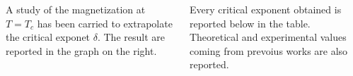 \documentclass{beamer}
\begin{document}
\begin{frame}

\begin{columns}


A study of the magnetization at $T=T_c$ has been carried to extrapolate the
critical exponet $\delta$. The result are reported in the graph on the right.

\vspace{2mm}

Every critical exponent obtained is reported below in the table. Theoretical and
experimental values coming from prevoius works are also reported.


\end{columns}

\begin{table}[h]
\end{table}

\end{frame}
\end{document}
